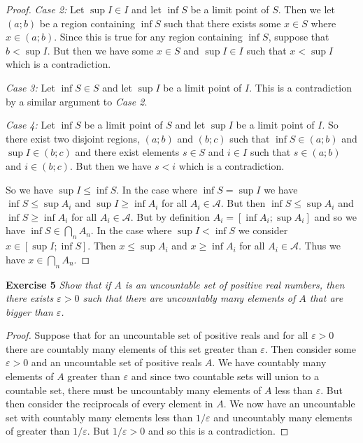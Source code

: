 \documentclass{article}
\begin{document}
\begin{flushleft}
\begin{proof}
\textit{Case 2:} Let $\sup I \in I$ and let $\inf S$ be a limit point of $S$. Then we let $(a;b)$ be a region containing $\inf S$ such that there exists some $x \in S$ where $x \in (a;b)$. Since this is true for any region containing $\inf S$, suppose that $b< \sup I$. But then we have some $x \in S$ and $\sup I \in I$ such that $x < \sup I$ which is a contradiction.\newline

\textit{Case 3:} Let $\inf S \in S$ and let $\sup I$ be a limit point of $I$. This is a contradiction by a similar argument to \textit{Case 2}.\newline

\textit{Case 4:} Let $\inf S$ be a limit point of $S$ and let $\sup I$ be a limit point of $I$. So there exist two disjoint regions, $(a;b)$ and $(b;c)$ such that $\inf S \in (a;b)$ and $\sup I \in (b;c)$ and there exist elements $s \in S$ and $i \in I$ such that $s \in (a;b)$ and $i \in (b;c)$. But then we have $s<i$ which is a contradiction.\newline

So we have $\sup I \leq \inf S$. In the case where $\inf S = \sup I$ we have $\inf S \leq \sup A_i$ and $\sup I \geq \inf A_i$ for all $A_i \in \mathcal{A}$. But then $\inf S \leq \sup A_i$ and $\inf S \geq \inf A_i$ for all $A_i \in \mathcal{A}$. But by definition $A_i=[\inf A_i ; \sup A_i]$ and so we have $\inf S \in \bigcap_n A_n$. In the case where $\sup I < \inf S$ we consider $x \in [\sup I ; \inf S]$. Then $x \leq \sup A_i$ and $x \geq \inf A_i$ for all $A_i \in \mathcal{A}$. Thus we have $x \in \bigcap_n A_n$.
\end{proof}

\textbf{Exercise 5}
\textsl{Show that if $A$ is an uncountable set of positive real numbers, then there exists $\varepsilon > 0$ such that there are uncountably many elements of $A$ that are bigger than $\varepsilon$.}
\begin{proof}
Suppose that for an uncountable set of positive reals and for all $\varepsilon > 0$ there are countably many elements of this set greater than $\varepsilon$. Then consider some $\varepsilon > 0$ and an uncountable set of positive reals $A$. We have countably many elements of $A$ greater than $\varepsilon$ and since two countable sets will union to a countable set, there must be uncountably many elements of $A$ less than $\varepsilon$. But then consider the reciprocals of every element in $A$. We now have an uncountable set with countably many elements less than $1/\varepsilon$ and uncountably many elements of greater than $1/\varepsilon$. But $1/\varepsilon > 0$ and so this is a contradiction.
\end{proof}


\end{flushleft}
\end{document}
